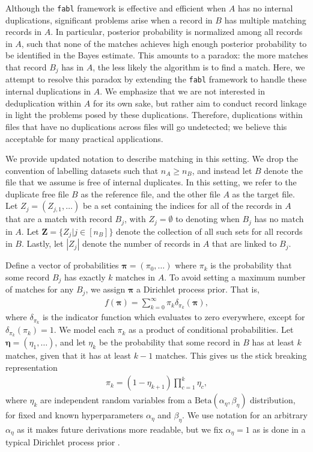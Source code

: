 \documentclass[12pt,letterpaper]{article}
\newcommand{\1}[1]{\mathbb{I}\!\left[#1\right]} %
\begin{document}
Although the \texttt{fabl} framework is effective and efficient when $A$ has no internal duplications, significant problems arise when a record in $B$ has multiple matching records in $A$. In particular, posterior probability is normalized among all records in $A$, such that none of the matches achieves high enough posterior probability to be identified in the Bayes estimate. This amounts to a paradox: the more matches that record $B_j$ has in $A$, the less likely the algorithm is to find a match. Here, we attempt to resolve this paradox by extending the \texttt{fabl} framework to handle these internal duplications in $A$. We emphasize that we are not interested in deduplication within $A$ for its own sake, but rather aim to conduct record linkage in light the problems posed by these duplications. Therefore, duplications within files that have no duplications across files will go undetected; we believe this acceptable for many practical applications. 

We provide updated notation to describe matching in this setting. We drop the convention of labelling datasets such that $n_A \geq n_B$, and instead let $B$ denote the file that we assume is free of internal duplicates. In this setting, we refer to the duplicate free file $B$ as the reference file, and the other file $A$ as the target file. Let $Z_j = (Z_{j, 1}, \ldots)$ be a set containing the indices for all of the records in $A$ that are a match with record $B_j$, with $Z_j = \emptyset$ to denoting when $B_j$ has no match in $A$. Let $\bm{Z} = \{Z_j | j \in [n_B] \}$ denote the collection of all such sets for all records in $B$. Lastly, let $|Z_j|$ denote the number of records in $A$ that are linked to $B_j$. 

Define a vector of probabilities $\bm{\pi} = (\pi_0, \ldots)$ where $\pi_k$ is the probability that some record $B_j$ has exactly $k$ matches in $A$. To avoid setting a maximum number of matches for any $B_j$, we assign $\bm{\pi}$ a Dirichlet process prior. That is, 
\begin{align*}%
	f(\bm{\pi}) = \sum_{k=0}^{\infty} \pi_k \delta_{\pi_k}(\bm{\pi}),
\end{align*}
where $\delta_{\pi_k}$ is the indicator function which evaluates to zero everywhere, except for $\delta_{\pi_k}(\pi_k) = 1$. We model each $\pi_k$ as a product of conditional probabilities. Let $\bm{\eta} = (\eta_1, \ldots)$, and let $\eta_k$ be the probability that some record in $B$ has at least $k$ matches, given that it has at least $k-1$ matches. This gives us the stick breaking representation
\begin{align}\label{eqn:pi-stick-breaking}
	\pi_k = (1 - \eta_{k+1}) \prod_{c=1}^{k} \eta_c, 
\end{align}
where $\eta_k$ are independent random variables from a $\text{Beta}(\alpha_{\eta}, \beta_{\eta})$ distribution, for fixed and known hyperparameters $\alpha_{\eta}$ and  $\beta_{\eta}$. We use notation for an arbitrary $\alpha_{\eta}$ as it makes future derivations more readable, but we fix $\alpha_{\eta} = 1$ as is done in a typical Dirichlet process prior \citep{jordan_2006}. 
\end{document}
